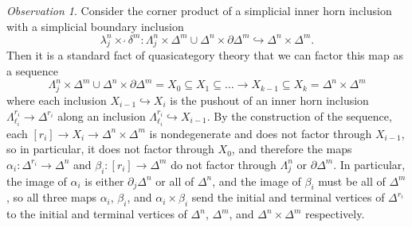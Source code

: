 \documentclass[leqno]{article}
\numberwithin{equation}{subsection}
\theoremstyle{plain}   %
\theoremstyle{remark}
\newtheorem{obs}[equation]{Observation}
\theoremstyle{plain}
\begin{document}
\begin{obs}\label{simplicialhorns}
	Consider the corner product of a simplicial inner horn inclusion with a simplicial boundary inclusion  
	\[\lambda^n_j\times^\lrcorner \delta^m: \Lambda^n_j \times \Delta^m \cup \Delta^n \times \partial \Delta^m \hookrightarrow \Delta^n\times \Delta^m.\]
	Then it is a standard fact of quasicategory theory that we can factor this map as a sequence
	\[\Lambda^n_j \times \Delta^m \cup \Delta^n \times \partial \Delta^m = X_0 \subseteq X_1 \subseteq \dots \to X_{k-1} \subseteq X_k=\Delta^n\times \Delta^m\]
	where each inclusion \(X_{i-1}\hookrightarrow X_i\) is the pushout of an inner horn inclusion \(\Lambda^{r_i}_{\ell_i} \to \Delta^{r_i}\) along an inclusion \(\Lambda^{r_i}_{\ell_i}\hookrightarrow X_{i-1}\).  By the construction of the sequence, each \([r_i]\to X_i\to \Delta^n\times \Delta^m\) is nondegenerate and does not factor through \(X_{i-1}\), so in particular, it does not factor through \(X_0\), and therefore the maps \(\alpha_i:\Delta^{r_i} \to \Delta^n\) and \(\beta_i:[r_i]\to \Delta^m\) do not factor through \(\Lambda^n_j\) or \(\partial \Delta^m\).  In particular, the image of \(\alpha_i\) is either \(\partial_j\Delta^n\) or all of \(\Delta^n\), and the image of \(\beta_i\) must be all of \(\Delta^m\), so all three maps \(\alpha_i\), \(\beta_i\), and \(\alpha_i \times \beta_i\) send the initial and terminal vertices of \(\Delta^{r_i}\) to the initial and terminal vertices of \(\Delta^n\), \(\Delta^m\), and \(\Delta^n\times\Delta^m\) respectively.
\end{obs}
\end{document}
